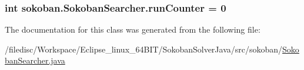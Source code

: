 \hypertarget{classsokoban_1_1SokobanSearcher_cafbb5effcf6f77396cacec598a3a16e}{
\subsubsection[{runCounter}]{\setlength{\rightskip}{0pt plus 5cm}int {\bf sokoban.SokobanSearcher.runCounter} = 0}}
\label{classsokoban_1_1SokobanSearcher_cafbb5effcf6f77396cacec598a3a16e}




The documentation for this class was generated from the following file:\begin{CompactItemize}
\item 
/filedisc/Workspace/Eclipse\_\-linux\_\-64BIT/SokobanSolverJava/src/sokoban/\hyperlink{SokobanSearcher_8java}{SokobanSearcher.java}\end{CompactItemize}
